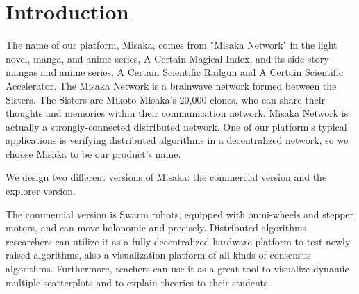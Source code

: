 \documentclass[sigconf]{acmart}
\begin{document}



\maketitle

\section{Introduction}

The name of our platform, Misaka, comes from "Misaka Network" in the light novel, manga, and anime series, A Certain Magical Index, and its side-story mangas and anime series, A Certain Scientific Railgun and A Certain Scientific Accelerator. The Misaka Network is a brainwave network formed between the Sisters. The Sisters are Mikoto Misaka's 20,000 clones, who can share their thoughts and memories within their communication network. Misaka Network is actually a strongly-connected distributed network. One of our platform's typical applications is verifying distributed algorithms in a decentralized network, so we choose Misaka to be our product's name.

We design two different versions of Misaka: the commercial version and the explorer version. 

The commercial version is Swarm robots, equipped with onmi-wheels and stepper motors, and can move holonomic and precisely. Distributed algorithms researchers can utilize it as a fully decentralized hardware platform to test newly raised algorithms, also a visualization platform of all kinds of consensus algorithms. Furthermore, teachers can use it as a great tool to visualize dynamic multiple scatterplots and to explain theories to their students. 
\end{document}
